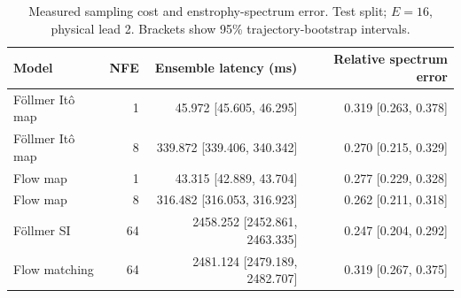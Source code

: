 \begin{table}[t]
\centering
\small
\setlength{\tabcolsep}{3pt}
\caption{Measured sampling cost and enstrophy-spectrum error. Test split; $E=16$, physical lead 2. Brackets show 95\% trajectory-bootstrap intervals.}
\label{tab:map-cost}
\begin{tabular}{lrrr}
\toprule
Model & NFE & Ensemble latency (ms) & Relative spectrum error \\
\midrule
Föllmer Itô map & 1 & 45.972 [45.605, 46.295] & 0.319 [0.263, 0.378] \\
Föllmer Itô map & 8 & 339.872 [339.406, 340.342] & 0.270 [0.215, 0.329] \\
\addlinespace
Flow map & 1 & 43.315 [42.889, 43.704] & 0.277 [0.229, 0.328] \\
Flow map & 8 & 316.482 [316.053, 316.923] & 0.262 [0.211, 0.318] \\
\addlinespace
Föllmer SI & 64 & 2458.252 [2452.861, 2463.335] & 0.247 [0.204, 0.292] \\
\addlinespace
Flow matching & 64 & 2481.124 [2479.189, 2482.707] & 0.319 [0.267, 0.375] \\
\bottomrule
\end{tabular}
\end{table}
